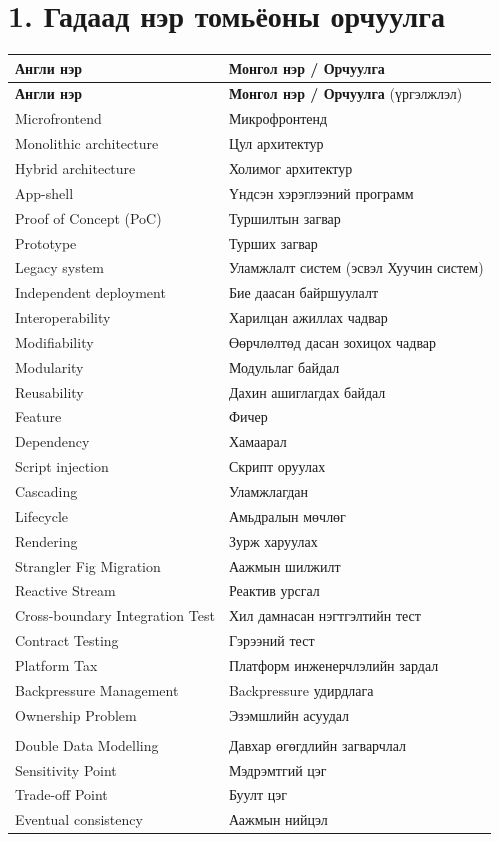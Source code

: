 \section*{1. Гадаад нэр томьёоны орчуулга}
\renewcommand{\arraystretch}{1}
\begin{longtable}{p{6cm} p{8cm}}
\toprule
\textbf{Англи нэр} & \textbf{Монгол нэр / Орчуулга} \\ 
\midrule
\endfirsthead %
\toprule
\textbf{Англи нэр} & \textbf{Монгол нэр / Орчуулга} (үргэлжлэл) \\ 
\midrule
\endhead %
\bottomrule
\endfoot %

Microfrontend & Микрофронтенд \\ 
Monolithic architecture & Цул архитектур \\ 
Hybrid architecture & Холимог архитектур \\ 
App-shell & Үндсэн хэрэглээний программ \\ 
Proof of Concept (PoC) & Туршилтын загвар \\ 
Prototype & Турших загвар \\ 
Legacy system & Уламжлалт систем (эсвэл Хуучин систем) \\ 
Independent deployment & Бие даасан байршуулалт \\ 
Interoperability & Харилцан ажиллах чадвар \\ 
Modifiability & Өөрчлөлтөд дасан зохицох чадвар \\ 
Modularity & Модульлаг байдал \\ 
Reusability & Дахин ашиглагдах байдал \\ 
Feature & Фичер \\ 
Dependency & Хамаарал \\ 
Script injection & Скрипт оруулах \\
Cascading & Уламжлагдан \\ 
Lifecycle & Амьдралын мөчлөг \\
Rendering & Зурж харуулах \\
Strangler Fig Migration & Аажмын шилжилт \\
Reactive Stream & Реактив урсгал \\
Cross-boundary Integration Test & Хил дамнасан нэгтгэлтийн тест \\
Contract Testing & Гэрээний тест \\
Platform Tax & Платформ инженерчлэлийн зардал \\
Backpressure Management & Backpressure удирдлага \\
Ownership Problem & Эзэмшлийн асуудал \\\\
Double Data Modelling & Давхар өгөгдлийн загварчлал \\
Sensitivity Point & Мэдрэмтгий цэг \\
Trade-off Point & Буулт цэг \\
Eventual consistency & Аажмын нийцэл \\
\end{longtable}
\newpage
